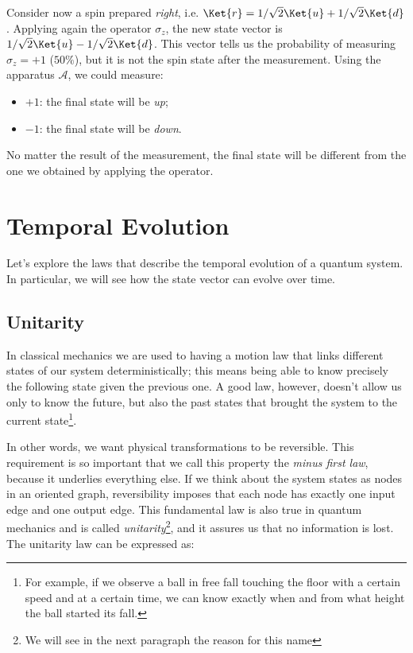 Consider now a spin prepared \emph{right}, i.e. $\Ket{r}= {1}/{\sqrt{2}}\Ket{u} + {1}/{\sqrt{2}}\Ket{d}$. Applying again the operator $\sigma_z$, the new state vector is ${1}/{\sqrt{2}}\Ket{u} - {1}/{\sqrt{2}}\Ket{d}$. This vector tells us the probability of measuring $\sigma_z = +1$ ($50\%$), but it is not the spin state after the measurement. Using the apparatus $\mathcal{A}$, we could measure:
\begin{itemize}
	\item $+1$: the final state will be \emph{up};
	\item $-1$: the final state will be \emph{down}.
\end{itemize} 
No matter the result of the measurement, the final state will be different from the one we obtained by applying the operator.

\section{Temporal Evolution}\label{sec:temp_evol}
Let's explore the laws that describe the temporal evolution of a quantum system. In particular, we will see how the state vector can evolve over time.

\subsection{Unitarity}
In classical mechanics we are used to having a motion law that links different states of our system deterministically; this means being able to know precisely the following state given the previous one. A good law, however, doesn't allow us only to know the future, but also the past states that brought the system to the current state\footnote{For example, if we observe a ball in free fall touching the floor with a certain speed and at a certain time, we can know exactly when and from what height the ball started its fall.}. 

In other words, we want physical transformations to be reversible. This requirement is so important that we call this property the \emph{minus first law}, because it underlies everything else. If we think about the system states as nodes in an oriented graph, reversibility imposes that each node has exactly one input edge and one output edge. This fundamental law is also true in quantum mechanics and is called \emph{unitarity}\footnote{We will see in the next paragraph the reason for this name}, and it assures us that no information is lost. The unitarity law can be expressed as:


